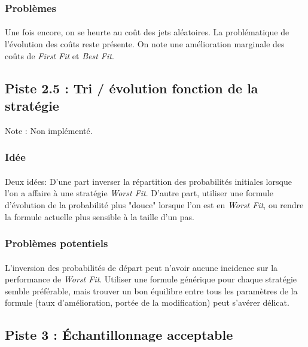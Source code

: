 \documentclass[a4paper,10pt]{report}
\begin{document}
\subsubsection{Problèmes}

\paragraph{}
  Une fois encore, on se heurte au coût des jets aléatoires. La problématique
de l'évolution des coûts reste présente. On note une amélioration marginale des
coûts de \textit{First Fit} et \textit{Best Fit}.


\subsection{Piste 2.5 : Tri / évolution fonction de la stratégie}

Note : Non implémenté.

\subsubsection{Idée}

\paragraph{}
  Deux idées: D'une part inverser la répartition des probabilités initiales
lorsque l'on a affaire à une stratégie \textit{Worst Fit}. D'autre part,
utiliser une formule d'évolution de la probabilité plus "douce" lorsque l'on
est en \textit{Worst Fit}, ou rendre la formule actuelle plus sensible à la
taille d'un pas.
  
\subsubsection{Problèmes potentiels}

\paragraph{}
  L'inversion des probabilités de départ peut n'avoir aucune incidence sur
la performance de \textit{Worst Fit}. Utiliser une formule générique pour chaque
stratégie semble préférable, mais trouver un bon équilibre entre tous les
paramètres de la formule (taux d'amélioration, portée de la modification) peut
s'avérer délicat.


\subsection{Piste 3 : Échantillonnage acceptable}
\end{document}
